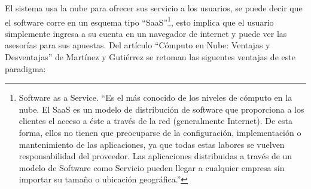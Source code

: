 El sistema usa la nube para ofrecer sus servicio a los usuarios, se puede decir que el software corre en un esquema tipo ``SaaS''\footnote{Software as a Service. ``Es el más conocido de los niveles de cómputo en la nube. El SaaS es un modelo de distribución de software que proporciona a los clientes el acceso a éste a través de la red (generalmente Internet). De esta forma, ellos no tienen que preocuparse de la configuración, implementación o mantenimiento de las aplicaciones, ya que todas estas labores se vuelven responsabilidad del proveedor. Las aplicaciones distribuidas a través de un modelo de Software como Servicio pueden llegar a cualquier empresa sin importar su tamaño o ubicación geográfica.''\cite{computoNube}}, esto implica que el usuario simplemente ingresa a su cuenta en un navegador de internet y puede ver las asesorías para sus apuestas.  
Del artículo ``Cómputo en Nube: Ventajas y Desventajas'' de Martínez y Gutiérrez\cite{computoNube}  se retoman las siguentes ventajas de este paradigma:
